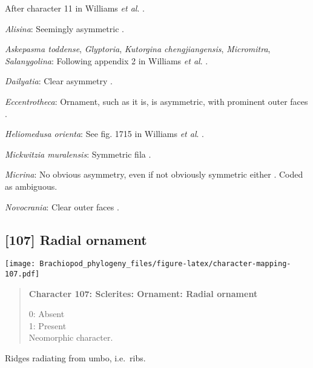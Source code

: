 \documentclass[openany]{book}
\theoremstyle{definition}
\theoremstyle{definition}
\theoremstyle{definition}
\theoremstyle{remark}
\begin{document}
After character 11 in Williams \emph{et al}.
\citeyearpar{Williams1998Thediversity}.

\hypertarget{Alisina-coding-106}{}
\emph{Alisina}: Seemingly asymmetric \citetext{\citealp[fig.
122.3c]{Williams2000LinguliformeaCraniiformea}; \citealp[Fig.
1]{Zhang2011Anobolellate}}.

\hypertarget{Askepasma_toddense-coding-106}{}
\emph{Askepasma toddense}, \emph{Glyptoria}, \emph{Kutorgina
chengjiangensis}, \emph{Micromitra}, \emph{Salanygolina}: Following
appendix 2 in Williams \emph{et al}.
\citeyearpar{Williams1998Thediversity}.

\hypertarget{Dailyatia-coding-106}{}
\emph{Dailyatia}: Clear asymmetry \citep{Skovsted2015Theearly}.

\hypertarget{Eccentrotheca-coding-106}{}
\emph{Eccentrotheca}: Ornament, such as it is, is asymmetric, with
prominent outer faces \citep{Skovsted2011Scleritomeconstruction}.

\hypertarget{Heliomedusa_orienta-coding-106}{}
\emph{Heliomedusa orienta}: See fig. 1715 in Williams \emph{et al}.
\citeyearpar{Williams2007Supplement}.

\hypertarget{Mickwitzia_muralensis-coding-106}{}
\emph{Mickwitzia muralensis}: Symmetric fila
\citep{Balthasar2004Shellstructure}.

\hypertarget{Micrina-coding-106}{}
\emph{Micrina}: No obvious asymmetry, even if not obviously symmetric
either \citep{Holmer2008TheEarly}. Coded as ambiguous.

\hypertarget{Novocrania-coding-106}{}
\emph{Novocrania}: Clear outer faces \citep[fig.
100.2b]{Williams2000LinguliformeaCraniiformea}.

\subsection*{{[}107{]} Radial ornament}\label{radial-ornament}

\texttt{[image: Brachiopod\_phylogeny\_files/figure-latex/character-mapping-107.pdf]}

\begin{quote}
\textbf{Character 107: Sclerites: Ornament: Radial ornament}

0: Absent\\
1: Present\\
Neomorphic character.
\end{quote}

Ridges radiating from umbo, i.e.~ribs.
\end{document}
